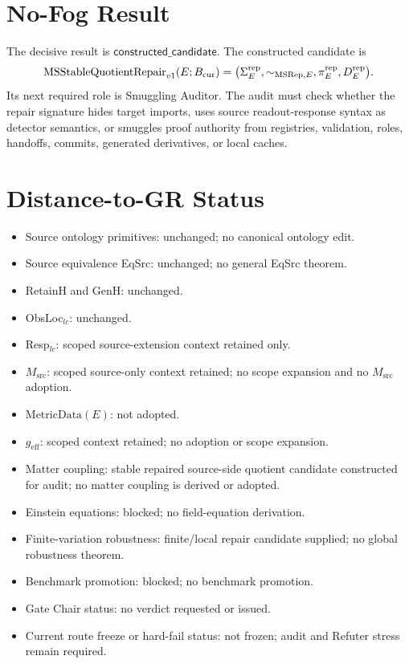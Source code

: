 \section{No-Fog Result}

The decisive result is \(\mathsf{constructed\_candidate}\). The constructed
candidate is
\[
  \mathrm{MSStableQuotientRepair}_{v1}(E;B_{\mathrm{cur}})=
  \bigl(\Sigma^{\mathrm{rep}}_E,\sim_{\mathrm{MSRep},E},\pi^{\mathrm{rep}}_E,D^{\mathrm{rep}}_E\bigr).
\]
Its next required role is Smuggling Auditor. The audit must check whether the
repair signature hides target imports, uses source readout-response syntax as
detector semantics, or smuggles proof authority from registries, validation,
roles, handoffs, commits, generated derivatives, or local caches.

\section{Distance-to-GR Status}

\begin{itemize}
  \item Source ontology primitives: unchanged; no canonical ontology edit.
  \item Source equivalence EqSrc: unchanged; no general EqSrc theorem.
  \item RetainH and GenH: unchanged.
  \item ObsLoc\(_{lc}\): unchanged.
  \item Resp\(_{lc}\): scoped source-extension context retained only.
  \item \(M_{\mathrm{src}}\): scoped source-only context retained; no scope
    expansion and no \(M_{\mathrm{src}}\) adoption.
  \item \(\mathrm{MetricData}(E)\): not adopted.
  \item \(g_{\mathrm{eff}}\): scoped context retained; no adoption or scope
    expansion.
  \item Matter coupling: stable repaired source-side quotient candidate
    constructed for audit; no matter coupling is derived or adopted.
  \item Einstein equations: blocked; no field-equation derivation.
  \item Finite-variation robustness: finite/local repair candidate supplied;
    no global robustness theorem.
  \item Benchmark promotion: blocked; no benchmark promotion.
  \item Gate Chair status: no verdict requested or issued.
  \item Current route freeze or hard-fail status: not frozen; audit and
    Refuter stress remain required.
\end{itemize}

